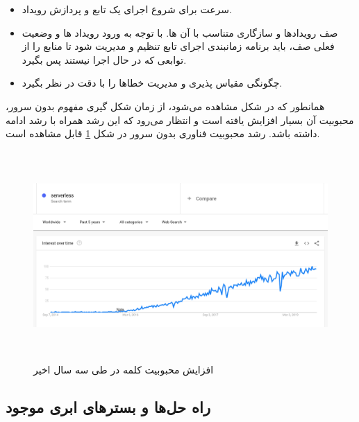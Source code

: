 \begin{itemize}
	
	\item سرعت برای شروع اجرای یک تابع و پردازش رویداد.
	
	\item صف رویدادها و سازگاری متناسب با آن ها. با توجه به ورود رویداد ها و وضعیت فعلی صف، باید برنامه زمانبندی اجرای تابع تنظیم و مدیریت شود تا منابع را از توابعی که در حال اجرا نیستند پس بگیرد.
	
	\item چگونگی مقیاس پذیری و مدیریت خطاها را با دقت در نظر بگیرد.
	
\end{itemize}

همانطور که در شکل مشاهده می‌شود، از زمان شکل گیری مفهوم بدون سرور، محبوبیت آن بسیار افزایش یافته است و انتظار می‌رود که این رشد همراه با رشد  ادامه داشته باشد. رشد محبوبیت فناوری بدون سرور در شکل \ref{serverless_google_trends} قابل مشاهده است.

\begin{figure}[!h]
	\centering
	\includegraphics[height=8cm]{images/serverless_google_trends}
	\caption{افزایش محبوبیت کلمه  ‌‌در  طی سه سال اخیر}
	\label{serverless_google_trends}
\end{figure}

\subsection{راه حل‌ها و بسترهای ابری موجود}


